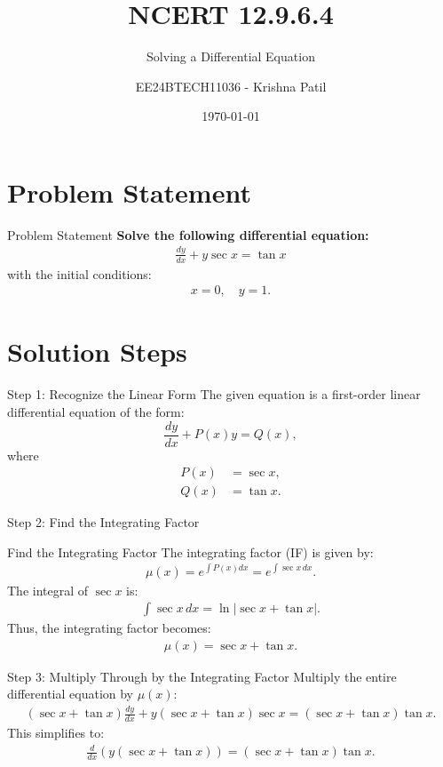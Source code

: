 \documentclass{beamer}
\title{NCERT 12.9.6.4}
\subtitle{Solving a Differential Equation}
\author{EE24BTECH11036 - Krishna Patil}
\date{\today}
\begin{document}
\frame{\titlepage}

\section{Problem Statement}
\begin{frame}{Problem Statement}
\textbf{Solve the following differential equation:}
\begin{align}
    \frac{dy}{dx} + y \sec x = \tan x
\end{align}
with the initial conditions:
\begin{align}
    x = 0, \quad y = 1.
\end{align}
\end{frame}

\section{Solution Steps}
\begin{frame}{Step 1: Recognize the Linear Form}
The given equation is a first-order linear differential equation of the form:
\begin{equation*}
    \frac{dy}{dx} + P(x)y = Q(x),
\end{equation*}
where
\begin{align*}
    P(x) &= \sec x, \\
    Q(x) &= \tan x.
\end{align*}
\end{frame}

\begin{frame}{Step 2: Find the Integrating Factor}
\begin{mybox}[label={step:integratingfactor}]{Find the Integrating Factor}
The integrating factor (IF) is given by:
\begin{align}
    \mu(x) = e^{\int P(x) dx} = e^{\int \sec x \, dx}.
\end{align}
The integral of $\sec x$ is:
\begin{align}
    \int \sec x \, dx = \ln |\sec x + \tan x|.
\end{align}
Thus, the integrating factor becomes:
\begin{align}
    \mu(x) = \sec x + \tan x.
\end{align}
\end{mybox}
\end{frame}

\begin{frame}{Step 3: Multiply Through by the Integrating Factor}
Multiply the entire differential equation by $\mu(x)$:
\begin{align}
    (\sec x + \tan x) \frac{dy}{dx} + y (\sec x + \tan x) \sec x = (\sec x + \tan x) \tan x.
\end{align}
This simplifies to:
\begin{align}
    \frac{d}{dx} \left( y (\sec x + \tan x) \right) = (\sec x + \tan x) \tan x.
\end{align}
\end{frame}
\end{document}
